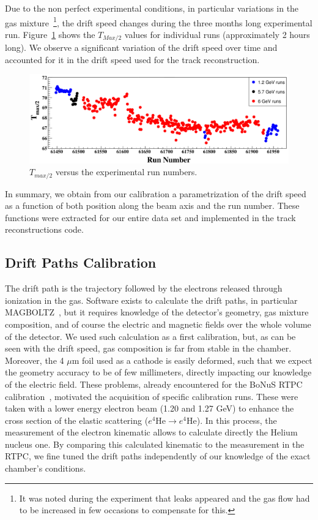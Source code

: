 \documentclass[preprint,5p]{elsarticle}
\begin{document}
Due to the non perfect experimental conditions, in particular variations in the 
gas mixture~\footnote{It was noted during the experiment that leaks appeared
and the gas flow had to be increased in few occasions to compensate for this.}, 
the drift speed changes during the three months long experimental run.  
Figure~\ref{fig:Drift_run_number_1} shows the $T_{Max/2}$ values for 
individual runs (approximately 2 hours long). We observe a significant 
variation of the drift speed over time and accounted for it in the drift 
speed used for the track reconstruction. 

\begin{figure}[tb]
\centering
\includegraphics[width=16.5cm]{fig_2017/Drift_run_number.pdf}
\caption{$T_{max/2}$ versus the experimental run numbers.} 
\label{fig:Drift_run_number_1}
\end{figure}


In summary, we obtain from our calibration a parametrization of the drift speed 
as a function of both position along the beam axis and the run number. These 
functions were extracted for our entire data set and implemented in the 
track reconstructions code.
   
\subsection{Drift Paths Calibration}

The drift path is the trajectory followed by the electrons released through 
ionization in the gas. Software exists to calculate the drift paths, in particular
MAGBOLTZ~\cite{MAGBOLTZ}, but it requires knowledge of the detector's 
geometry, gas mixture composition, and of course the electric and magnetic 
fields over the whole volume of the detector. We used such calculation as a 
first calibration, but, 
as can be seen with the drift speed, gas composition is far from stable in the 
chamber. Moreover, the 4 $\mu$m foil used as a cathode is easily deformed, such
that we expect the geometry accuracy to be of few millimeters, directly impacting 
our knowledge of the electric field. These problems, already 
encountered for the BoNuS RTPC calibration~\cite{BONUS-NIM}, motivated the 
acquisition of specific calibration runs. These were taken with a lower energy 
electron beam (1.20 and 1.27 GeV) to enhance the cross section of the elastic 
scattering ($e^{4}$He$\rightarrow e^{4}$He). In this process, the measurement of
the electron kinematic allows to calculate directly the Helium nucleus one. 
By comparing this calculated kinematic to the measurement in the RTPC, we fine tuned
the drift paths independently of our knowledge of the exact chamber's conditions.
\end{document}
